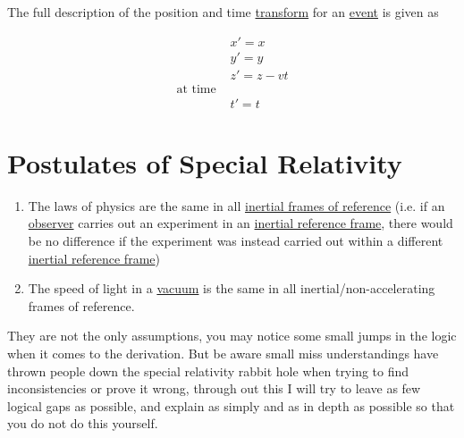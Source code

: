 The full description of the position and time \hyperlink{def-transform}{transform} for an \hyperlink{def-event}{event} is given as

\begin{equation}%
    \begin{aligned}
      &  x'=x \\ & y'=y \\ &z' = z-vt  \\ 
      \text{at time \ \ \ } \\
      & t'= t  
    \end{aligned}
    \label{eq: Galilean transformation}
\end{equation}%


\section{Postulates of Special Relativity}%
 
\begin{tcolorbox}[breakable]
\begin{enumerate}
    \item The laws of physics are the same in all \hyperlink{def-Inertial-reference-frame}{inertial frames of reference} (i.e. if an \hyperlink{def-observer}{observer} carries out an experiment in an \hyperlink{def-Inertial-reference-frame}{inertial reference frame}, there would be no difference if the experiment was instead carried out within a different \hyperlink{def-Inertial-reference-frame}{inertial reference frame})
    \item The speed of light in a \hyperlink{def-vacuum}{vacuum} is the same in all inertial/non-accelerating frames of reference.
\end{enumerate}
\end{tcolorbox}

They are not the only assumptions, you may notice some small jumps in the logic when it comes to the derivation. But be aware small miss understandings have thrown people down the special relativity rabbit hole when trying to find inconsistencies or prove it wrong, through out this I will try to leave as few logical gaps as possible, and explain as simply and as in depth as possible so that you do not do this yourself.


